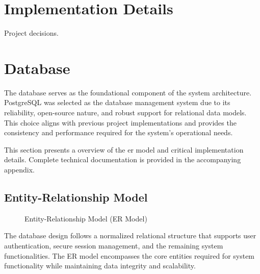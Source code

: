 \section{Implementation Details}
Project decisions.

\section{Database}
The database serves as the foundational component of the system architecture. PostgreSQL was selected as the database management system due to its reliability, open-source nature, and robust support for relational data models. This choice aligns with previous project implementations and provides the consistency and performance required for the system's operational needs.

This section presents a overview of the \ac{er model} and critical implementation details. Complete technical documentation is provided in the accompanying appendix.

\subsection{Entity-Relationship Model}

\begin{figure}[h]
    \begin{center}
    \end{center}
    \caption{Entity-Relationship Model (ER Model)}
    \label{fig:er_model}
\end{figure}

The database design follows a normalized relational structure that supports user authentication, secure session management, and the remaining system functionalities. The ER model encompasses the core entities required for system functionality while maintaining data integrity and scalability.

